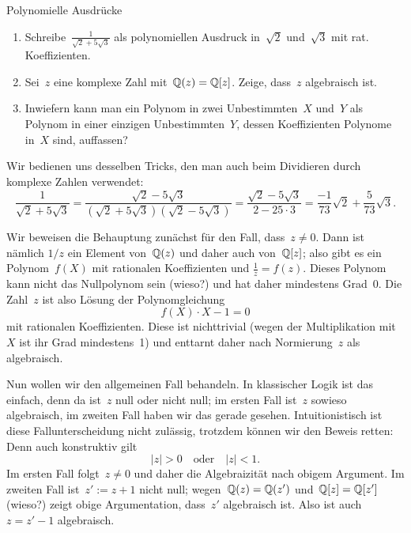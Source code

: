 \documentclass{algblatt}
\begin{document}
\begin{aufgabe}{Polynomielle Ausdrücke}
\begin{enumerate}
\item Schreibe~$\frac{1}{\sqrt{2} + 5\sqrt{3}}$ als polynomiellen Ausdruck
in~$\sqrt{2}$ und~$\sqrt{3}$ mit rat. Koeffizienten.
\item Sei~$z$ eine komplexe Zahl mit~$\mathbb{Q}(z) = \mathbb{Q}[z]$. Zeige, dass~$z$
algebraisch ist.
\item Inwiefern kann man ein Polynom in zwei Unbestimmten~$X$ und~$Y$ als
Polynom in einer einzigen Unbestimmten~$Y$, dessen Koeffizienten
Polynome in~$X$ sind, auffassen?
\end{enumerate}
\begin{loesungE}
\item Wir bedienen uns desselben Tricks, den man auch beim Dividieren durch
komplexe Zahlen verwendet:
\[ \frac{1}{\sqrt{2} + 5\sqrt{3}} =
  \frac{\sqrt{2} - 5\sqrt{3}}{(\sqrt{2} + 5\sqrt{3}) (\sqrt{2} - 5\sqrt{3})} =
  \frac{\sqrt{2} - 5\sqrt{3}}{2 - 25 \cdot 3} =
  \frac{-1}{73} \sqrt{2} + \frac{5}{73} \sqrt{3}. \]

\item Wir beweisen die Behauptung zunächst für den Fall, dass~$z \neq 0$. Dann
ist nämlich $1/z$ ein Element von~$\mathbb{Q}(z)$ und daher auch von~$\mathbb{Q}[z]$; also
gibt es ein Polynom~$f(X)$ mit rationalen Koeffizienten und
$\frac{1}{z} = f(z)$. Dieses Polynom kann nicht das Nullpolynom sein (wieso?)
und hat daher mindestens Grad~0. Die Zahl~$z$ ist also Lösung der
Polynomgleichung
\[ f(X) \cdot X - 1 = 0 \]
mit rationalen Koeffizienten. Diese ist nichttrivial (wegen der Multiplikation
mit~$X$ ist ihr Grad mindestens~1) und enttarnt daher nach Normierung~$z$ als
algebraisch.

Nun wollen wir den allgemeinen Fall behandeln. In klassischer Logik ist das
einfach, denn da ist~$z$ null oder nicht null; im ersten Fall ist~$z$ sowieso
algebraisch, im zweiten Fall haben wir das gerade gesehen. Intuitionistisch ist
diese Fallunterscheidung nicht zulässig, trotzdem können wir den Beweis retten:
Denn auch konstruktiv gilt
\[ |z| > 0 \quad\text{oder}\quad |z| < 1. \]
Im ersten Fall folgt~$z \neq 0$ und daher die Algebraizität nach obigem
Argument. Im zweiten Fall ist~$z' := z + 1$ nicht null; wegen~$\mathbb{Q}(z) =
\mathbb{Q}(z')$ und~$\mathbb{Q}[z] = \mathbb{Q}[z']$ (wieso?) zeigt obige Argumentation, dass~$z'$
algebraisch ist. Also ist auch~$z = z' - 1$ algebraisch.
\end{loesungE}
\end{aufgabe}
\end{document}
